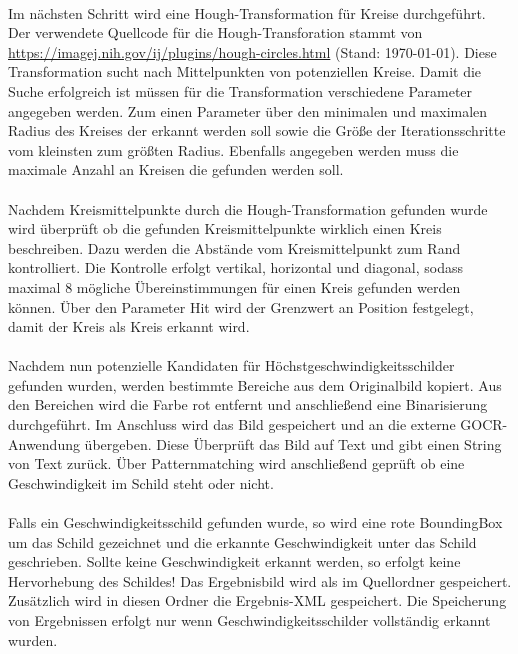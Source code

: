 \paragraph*{}
Im nächsten Schritt wird eine Hough-Transformation für Kreise durchgeführt.
Der verwendete Quellcode für die Hough-Transforation stammt von \url{https://imagej.nih.gov/ij/plugins/hough-circles.html} (Stand: \today).
Diese Transformation sucht nach Mittelpunkten von potenziellen Kreise.
Damit die Suche erfolgreich ist müssen für die Transformation verschiedene Parameter angegeben werden.
Zum einen Parameter über den minimalen und maximalen Radius des Kreises der erkannt werden soll sowie die Größe der Iterationsschritte vom kleinsten zum größten Radius.
Ebenfalls angegeben werden muss die maximale Anzahl an Kreisen die gefunden werden soll. 

\paragraph*{}
Nachdem Kreismittelpunkte durch die Hough-Transformation gefunden wurde wird überprüft ob die gefunden Kreismittelpunkte wirklich einen Kreis beschreiben.
Dazu werden die Abstände vom Kreismittelpunkt zum Rand kontrolliert.
Die Kontrolle erfolgt vertikal, horizontal und diagonal, sodass maximal 8 mögliche Übereinstimmungen für einen Kreis gefunden werden können.
Über den Parameter Hit wird der Grenzwert an Position festgelegt, damit der Kreis als Kreis erkannt wird.

\paragraph*{}
Nachdem nun potenzielle Kandidaten für Höchstgeschwindigkeitsschilder gefunden wurden, werden bestimmte Bereiche aus dem Originalbild kopiert.
Aus den Bereichen wird die Farbe rot entfernt und anschließend eine Binarisierung durchgeführt.
Im Anschluss wird das Bild gespeichert und an die externe GOCR-Anwendung übergeben.
Diese Überprüft das Bild auf Text und gibt einen String von Text zurück.
Über Patternmatching wird anschließend geprüft ob eine Geschwindigkeit im Schild steht oder nicht.

\paragraph*{}
Falls ein Geschwindigkeitsschild gefunden wurde, so wird eine rote BoundingBox um das Schild gezeichnet und die erkannte Geschwindigkeit unter das Schild geschrieben.
Sollte keine Geschwindigkeit erkannt werden, so erfolgt keine Hervorhebung des Schildes!
Das Ergebnisbild wird als  im Quellordner gespeichert.
Zusätzlich wird in diesen Ordner die Ergebnis-XML gespeichert.
Die Speicherung von Ergebnissen erfolgt nur wenn Geschwindigkeitsschilder vollständig erkannt wurden.

